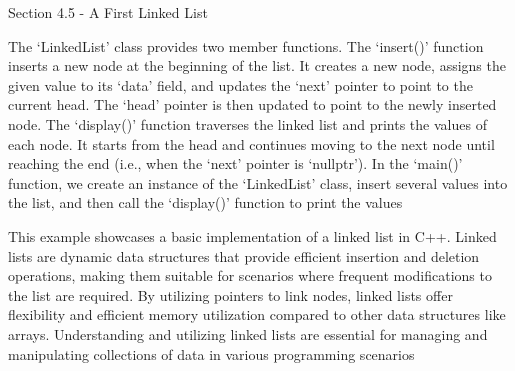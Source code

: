 \begin{notes}{Section 4.5 - A First Linked List}
\begin{highlight}
        The `LinkedList' class provides two member functions. The `insert()' function inserts a new node at the beginning of the list. It creates a new node, assigns the given value to its `data' field, and updates the `next' pointer to point to the current 
        head. The `head' pointer is then updated to point to the newly inserted node. The `display()' function traverses the linked list and prints the values of each node. It starts from the head and continues moving to the next node until reaching the end 
        (i.e., when the `next' pointer is `nullptr'). In the `main()' function, we create an instance of the `LinkedList' class, insert several values into the list, and then call the `display()' function to print the values
        
        This example showcases a basic implementation of a linked list in C++. Linked lists are dynamic data structures that provide efficient insertion and deletion operations, making them suitable for scenarios where frequent modifications to the list are 
        required. By utilizing pointers to link nodes, linked lists offer flexibility and efficient memory utilization compared to other data structures like arrays. Understanding and utilizing linked lists are essential for managing and manipulating collections 
        of data in various programming scenarios
    \end{highlight}
\end{notes}

